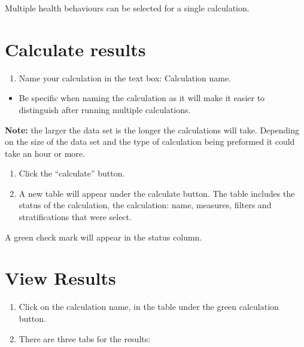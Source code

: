 \documentclass[]{book}
\providecommand{\tightlist}{%
  \setlength{\itemsep}{0pt}\setlength{\parskip}{0pt}}
\begin{document}
Multiple health behaviours can be selected for a single calculation.

\section{Calculate results}\label{calculate-results}

\begin{enumerate}
\def\labelenumi{\arabic{enumi}.}
\tightlist
\item
  Name your calculation in the text box: Calculation name.
\end{enumerate}

\begin{itemize}
\tightlist
\item
  Be specific when naming the calculation as it will make it easier to
  distinguish after running multiple calculations.
\end{itemize}

\textbf{Note:} the larger the data set is the longer the calculations
will take. Depending on the size of the data set and the type of
calculation being preformed it could take an hour or more.

\begin{enumerate}
\def\labelenumi{\arabic{enumi}.}
\setcounter{enumi}{1}
\item
  Click the ``calculate'' button.
\item
  A new table will appear under the calculate button. The table includes
  the status of the calculation, the calculation: name, measures,
  filters and stratifications that were select.
\end{enumerate}

A green check mark will appear in the status column.

\section{View Results}\label{view-results}

\begin{enumerate}
\def\labelenumi{\arabic{enumi}.}
\item
  Click on the calculation name, in the table under the green
  calculation button.
\item
  There are three tabs for the results:
\end{enumerate}
\end{document}
